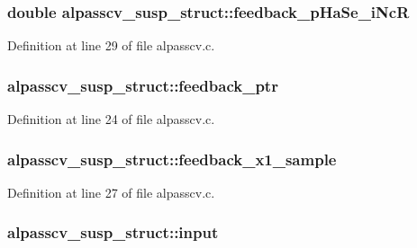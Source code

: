 \subsubsection[{\texorpdfstring{feedback\+\_\+p\+Ha\+Se\+\_\+i\+NcR}{feedback_pHaSe_iNcR}}]{\setlength{\rightskip}{0pt plus 5cm}double alpasscv\+\_\+susp\+\_\+struct\+::feedback\+\_\+p\+Ha\+Se\+\_\+i\+NcR}\hypertarget{structalpasscv__susp__struct_a70914732369f10300366b44621dd3b1d}{}\label{structalpasscv__susp__struct_a70914732369f10300366b44621dd3b1d}


Definition at line 29 of file alpasscv.\+c.

\subsubsection[{\texorpdfstring{feedback\+\_\+ptr}{feedback_ptr}}]{ alpasscv\+\_\+susp\+\_\+struct\+::feedback\+\_\+ptr}\hypertarget{structalpasscv__susp__struct_a56a104fbbed14c678d3f66e0504b24b4}{}\label{structalpasscv__susp__struct_a56a104fbbed14c678d3f66e0504b24b4}


Definition at line 24 of file alpasscv.\+c.

\subsubsection[{\texorpdfstring{feedback\+\_\+x1\+\_\+sample}{feedback_x1_sample}}]{ alpasscv\+\_\+susp\+\_\+struct\+::feedback\+\_\+x1\+\_\+sample}\hypertarget{structalpasscv__susp__struct_afaed9503b2ba5fbc1a035b5c730e896a}{}\label{structalpasscv__susp__struct_afaed9503b2ba5fbc1a035b5c730e896a}


Definition at line 27 of file alpasscv.\+c.

\subsubsection[{\texorpdfstring{input}{input}}]{ alpasscv\+\_\+susp\+\_\+struct\+::input}\hypertarget{structalpasscv__susp__struct_aad83327d5f603dc9253dd1be25851da2}{}\label{structalpasscv__susp__struct_aad83327d5f603dc9253dd1be25851da2}


